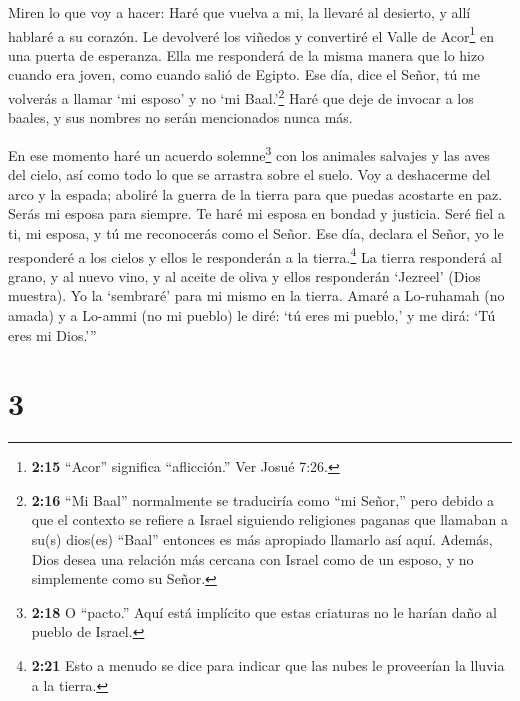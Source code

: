  Miren lo que voy a hacer: Haré que vuelva a mi, la llevaré
al desierto, y allí hablaré a su corazón.  Le devolveré los
viñedos y convertiré el Valle de Acor\footnote{\textbf{2:15} ``Acor''
  significa ``aflicción.'' Ver Josué 7:26.} en una puerta de esperanza.
Ella me responderá de la misma manera que lo hizo cuando era joven, como
cuando salió de Egipto.  Ese día, dice el Señor, tú me
volverás a llamar `mi esposo' y no `mi Baal.'\footnote{\textbf{2:16}
  ``Mi Baal'' normalmente se traduciría como ``mi Señor,'' pero debido a
  que el contexto se refiere a Israel siguiendo religiones paganas que
  llamaban a su(s) dios(es) ``Baal'' entonces es más apropiado llamarlo
  así aquí. Además, Dios desea una relación más cercana con Israel como
  de un esposo, y no simplemente como su Señor.}  Haré que
deje de invocar a los baales, y sus nombres no serán mencionados nunca
más.

 En ese momento haré un acuerdo solemne\footnote{\textbf{2:18}
  O ``pacto.'' Aquí está implícito que estas criaturas no le harían daño
  al pueblo de Israel.} con los animales salvajes y las aves del cielo,
así como todo lo que se arrastra sobre el suelo. Voy a deshacerme del
arco y la espada; aboliré la guerra de la tierra para que puedas
acostarte en paz.  Serás mi esposa para siempre. Te haré mi
esposa en bondad y justicia.  Seré fiel a ti, mi esposa, y
tú me reconocerás como el Señor.  Ese día, declara el
Señor, yo le responderé a los cielos y ellos le responderán a la
tierra.\footnote{\textbf{2:21} Esto a menudo se dice para indicar que
  las nubes le proveerían la lluvia a la tierra.}  La
tierra responderá al grano, y al nuevo vino, y al aceite de oliva y
ellos responderán `Jezreel' (Dios muestra).  Yo la
`sembraré' para mi mismo en la tierra. Amaré a Lo-ruhamah (no amada) y a
Lo-ammi (no mi pueblo) le diré: `tú eres mi pueblo,' y me dirá: `Tú eres
mi Dios.'''

\hypertarget{section-2}{%
\section{3}\label{section-2}}


